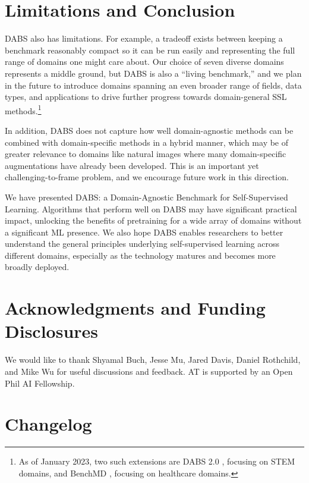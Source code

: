 \documentclass{article}
\begin{document}
\section{Limitations and Conclusion}
\label{sec:conclusion}

DABS also has limitations. For example, a tradeoff exists between keeping a benchmark reasonably compact so it can be run easily and representing the full range of domains one might care about. Our choice of seven diverse domains represents a middle ground, but DABS is also a ``living benchmark,'' and we plan in the future to introduce domains spanning an even broader range of fields, data types, and applications to drive further progress towards domain-general SSL methods.\footnote{As of January 2023, two such extensions are DABS 2.0 \citep{tamkin2022dabs}, focusing on STEM domains, and BenchMD \citep{BenchMD}, focusing on healthcare domains.} 

In addition, DABS does not capture how well domain-agnostic methods can be combined with domain-specific methods in a hybrid manner, which may be of greater relevance to domains like natural images where many domain-specific augmentations have already been developed. This is an important yet challenging-to-frame problem, and we encourage future work in this direction.

We have presented DABS: a Domain-Agnostic Benchmark for Self-Supervised Learning. Algorithms that perform well on DABS may have significant practical impact, unlocking the benefits of pretraining for a wide array of domains without a significant ML presence. We also hope DABS enables researchers to better understand the general principles underlying self-supervised learning across different domains, especially as the technology matures and becomes more broadly deployed.

\section*{Acknowledgments and Funding Disclosures}
We would like to thank Shyamal Buch, Jesse Mu, Jared Davis, Daniel Rothchild, and Mike Wu for useful discussions and feedback. AT is supported by an Open Phil AI Fellowship.






\newpage
\appendix

\section{Changelog}
\end{document}
